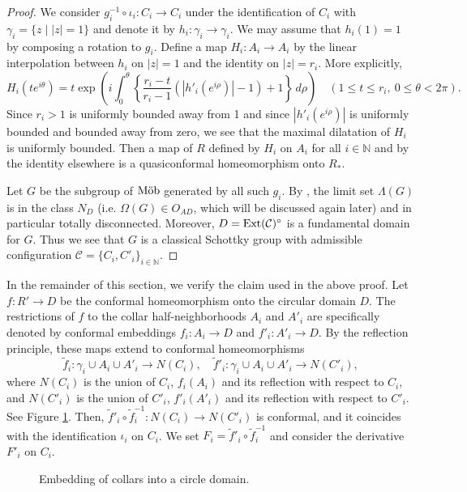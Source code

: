 \documentclass[12pt]{amsart}
\theoremstyle{plain}
\DeclareMathOperator{\Mob}{\mbox{\rm{M\"ob}}}
\DeclareMathOperator{\Ext}{\rm Ext}
\begin{document}
\begin{proof}
We consider $g_i^{-1} \circ \iota_i:C_i \to C_i$ under the identification of $C_i$ with $\gamma_i=\{z \mid |z|=1\}$
and denote it by $h_i:\gamma_i \to \gamma_i$. 
We may assume that $h_i(1)=1$ by composing a rotation to $g_i$.
Define a map $H_i:A_i \to A_i$ by the linear interpolation between $h_i$ on $|z|=1$ and the identity on $|z|=r_i$.
More explicitly,
$$
H_i(te^{i\theta})=t\exp \left(i\int_0^\theta \left \{\frac{r_i-t}{r_i-1}(|h'_i(e^{i\rho})|-1)+1 \right \}\,d\rho \right)
\quad (1 \leq t \leq r_i,\ 0 \leq \theta < 2\pi).
$$
Since $r_i>1$ is uniformly bounded away from 1 and since $|h'_i(e^{i\rho})|$ is uniformly bounded and bounded away from zero,
we see that the maximal dilatation of $H_i$ is uniformly bounded.
Then a map of $R$ defined by $H_i$ on $A_i$ for all $i \in \mathbb N$ and by the identity elsewhere
is a quasiconformal homeomorphism onto $R_*$.

Let $G$ be the  subgroup of $\Mob$ generated by all such $g_i$.
By \cite[Th.2]{MaiTani}, the limit set
$\Lambda(G)$ is in the class $N_{D}$ (i.e. $\Omega(G) \in O_{AD}$, which will be discussed again later)
and in particular totally disconnected. Moreover, 
$D=\Ext(\mathcal C)^\circ$ is a fundamental domain for $G$.
Thus we see that $G$ is a classical Schottky group with admissible configuration  
${\mathcal C}=\{C_i, C'_i\}_{i \in \mathbb N}$.
\end{proof}

In the remainder of this section, we verify the claim used in the above proof.
Let $f:R' \to D$ be the conformal homeomorphism onto the circular domain $D$.
The restrictions of $f$ to the collar half-neighborhoods $A_i$ and $A'_i$ are specifically denoted by conformal embeddings
$f_i:A_i \to D$ and $f'_i:A'_i \to D$. By the reflection principle,
these maps extend to conformal homeomorphisms
$$
\tilde f_i:\gamma_i \cup A_i \cup A'_i \to N(C_i), \quad \tilde f'_i:\gamma_i \cup A_i \cup A'_i \to N(C'_i),
$$
where $N(C_i)$ is the union of $C_i$, $f_i(A_i)$ and its reflection with respect to $C_i$, and
$N(C'_i)$ is the union of $C'_i$, $f'_i(A'_i)$ and its reflection with respect to $C'_i$.
See Figure \ref{fig: EmdCollars}.
Then, $\tilde f'_i \circ \tilde f_i^{-1}:N(C_i) \to N(C'_i)$ is conformal, and
it coincides with the identification $\iota_i$ on $C_i$. We set $F_i=\tilde f'_i \circ \tilde f_i^{-1}$ and
consider the derivative $F'_i$ on $C_i$.

\begin{figure}[h]
\begin{center}
\vspace{-1cm}
\end{center}
\caption{Embedding of collars into a circle domain.} \label{fig: EmdCollars}

\end{figure}
\end{document}
